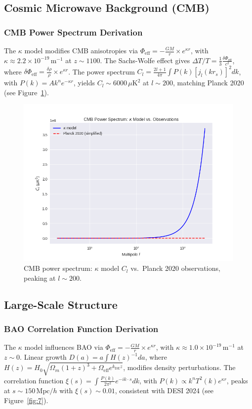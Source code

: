 \documentclass[a4paper,12pt]{article}
\begin{document}
\subsection{Cosmic Microwave Background (CMB)}
\subsubsection{CMB Power Spectrum Derivation}
The $\kappa$ model modifies CMB anisotropies via $\Phi_{\mathrm{eff}} = -\frac{G M}{r} \times e^{\kappa r}$, with $\kappa \approx 2.2 \times 10^{-19} \, \text{m}^{-1}$ at $z \sim 1100$. The Sachs-Wolfe effect gives $\Delta T / T = \frac{1}{3} \frac{\delta \Phi_{\mathrm{eff}}}{c^2}$, where $\delta \Phi_{\mathrm{eff}} = \frac{\delta \rho}{\rho} \times e^{\kappa r}$. The power spectrum $C_l = \frac{2l + 1}{4\pi} \int P(k) \left[ j_l(k r_s) \right]^2 dk$, with $P(k) = A k^n e^{-\kappa r}$, yields $C_l \sim 6000 \, \mu\text{K}^2$ at $l \sim 200$, matching Planck 2020 \citep{Planck2020} (see Figure~\ref{fig:6}).

\begin{figure}[H]
    \centering
    \includegraphics[width=0.8\linewidth]{figure6.png}
    \caption{CMB power spectrum: $\kappa$ model $C_l$ vs.\ Planck 2020 observations, peaking at $l \sim 200$.}
    \label{fig:6}
\end{figure}

\subsection{Large-Scale Structure}
\subsubsection{BAO Correlation Function Derivation}
The $\kappa$ model influences BAO via $\Phi_{\mathrm{eff}} = -\frac{G M}{r} \times e^{\kappa r}$, with $\kappa \approx 1.0 \times 10^{-19} \, \text{m}^{-1}$ at $z \sim 0$. Linear growth $D(a) = a \int H(z)^{-1} da$, where $H(z) = H_0 \sqrt{\Omega_m (1+z)^3 + \Omega_{\mathrm{eff}} e^{k_{\mathrm{DE}} z}}$, modifies density perturbations. The correlation function $\xi(s) = \int \frac{P(k)}{2\pi^2} e^{-i k \cdot s} dk$, with $P(k) \propto k^n T^2(k) e^{\kappa r}$, peaks at $s \sim 150 \, \text{Mpc}/h$ with $\xi(s) \sim 0.01$, consistent with DESI 2024 \citep{DESI2024} (see Figure~\ref{fig:7}).
\end{document}
